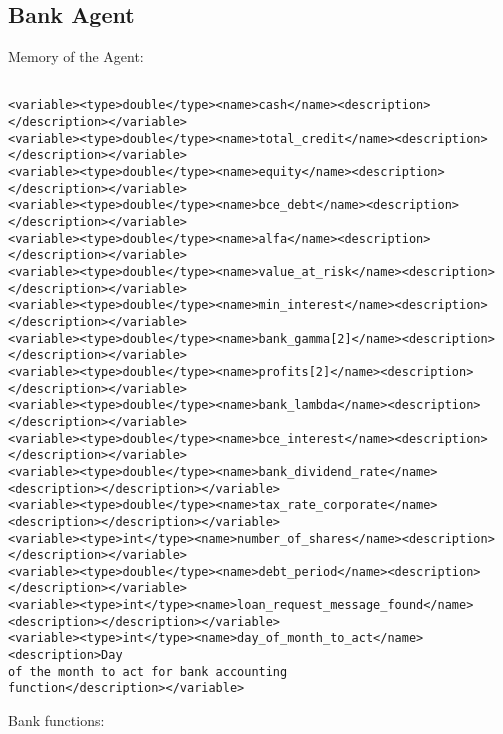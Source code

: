 \subsection{Bank Agent}
Memory of the Agent:
\begin{mylisting}
\begin{verbatim}

<variable><type>double</type><name>cash</name><description></description></variable>
<variable><type>double</type><name>total_credit</name><description></description></variable>
<variable><type>double</type><name>equity</name><description></description></variable>
<variable><type>double</type><name>bce_debt</name><description></description></variable>
<variable><type>double</type><name>alfa</name><description></description></variable>
<variable><type>double</type><name>value_at_risk</name><description></description></variable>
<variable><type>double</type><name>min_interest</name><description></description></variable>
<variable><type>double</type><name>bank_gamma[2]</name><description></description></variable>
<variable><type>double</type><name>profits[2]</name><description></description></variable>
<variable><type>double</type><name>bank_lambda</name><description></description></variable>
<variable><type>double</type><name>bce_interest</name><description></description></variable>
<variable><type>double</type><name>bank_dividend_rate</name><description></description></variable>
<variable><type>double</type><name>tax_rate_corporate</name><description></description></variable>
<variable><type>int</type><name>number_of_shares</name><description></description></variable>
<variable><type>double</type><name>debt_period</name><description></description></variable>
<variable><type>int</type><name>loan_request_message_found</name><description></description></variable>
<variable><type>int</type><name>day_of_month_to_act</name><description>Day
of the month to act for bank accounting
function</description></variable>

\end{verbatim}
\end{mylisting}

Bank functions:

